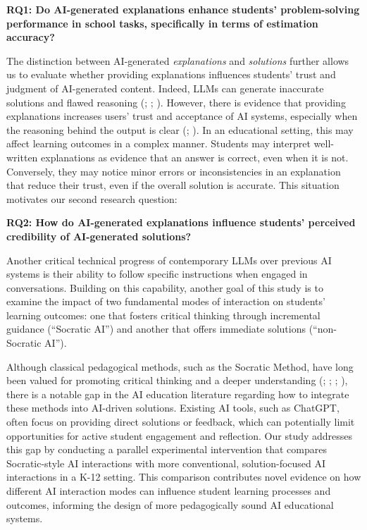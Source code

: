 \documentclass[
  12pt,
]{article}
\begin{document}
\textbf{RQ1: Do AI-generated explanations enhance students' problem-solving performance in school tasks, specifically in terms of estimation accuracy?}

The distinction between AI-generated \emph{explanations} and \emph{solutions} further allows us to evaluate whether providing explanations influences students' trust and judgment of AI-generated content. Indeed, LLMs can generate inaccurate solutions and flawed reasoning (; ; ). However, there is evidence that providing explanations increases users' trust and acceptance of AI systems, especially when the reasoning behind the output is clear (; ). In an educational setting, this may affect learning outcomes in a complex manner. Students may interpret well-written explanations as evidence that an answer is correct, even when it is not. Conversely, they may notice minor errors or inconsistencies in an explanation that reduce their trust, even if the overall solution is accurate. This situation motivates our second research question:

\textbf{RQ2: How do AI-generated explanations influence students' perceived credibility of AI-generated solutions?}

Another critical technical progress of contemporary LLMs over previous AI systems is their ability to follow specific instructions when engaged in conversations. Building on this capability, another goal of this study is to examine the impact of two fundamental modes of interaction on students' learning outcomes: one that fosters critical thinking through incremental guidance (``Socratic AI'') and another that offers immediate solutions (``non-Socratic AI'').

Although classical pedagogical methods, such as the Socratic Method, have long been valued for promoting critical thinking and a deeper understanding (; ; ; ), there is a notable gap in the AI education literature regarding how to integrate these methods into AI-driven solutions. Existing AI tools, such as ChatGPT, often focus on providing direct solutions or feedback, which can potentially limit opportunities for active student engagement and reflection. Our study addresses this gap by conducting a parallel experimental intervention that compares Socratic-style AI interactions with more conventional, solution-focused AI interactions in a K-12 setting. This comparison contributes novel evidence on how different AI interaction modes can influence student learning processes and outcomes, informing the design of more pedagogically sound AI educational systems.
\end{document}
